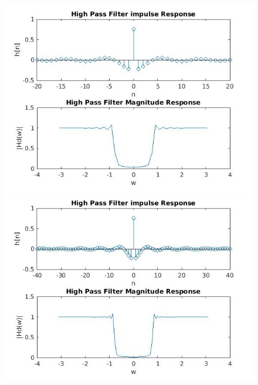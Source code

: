 \documentclass{article}
\begin{document}
\begin{figure}[H]
\includegraphics[scale = .5]{1_hpf_20}
\includegraphics[scale = .5]{1_hpf_40}
\end{figure}
\end{document}
